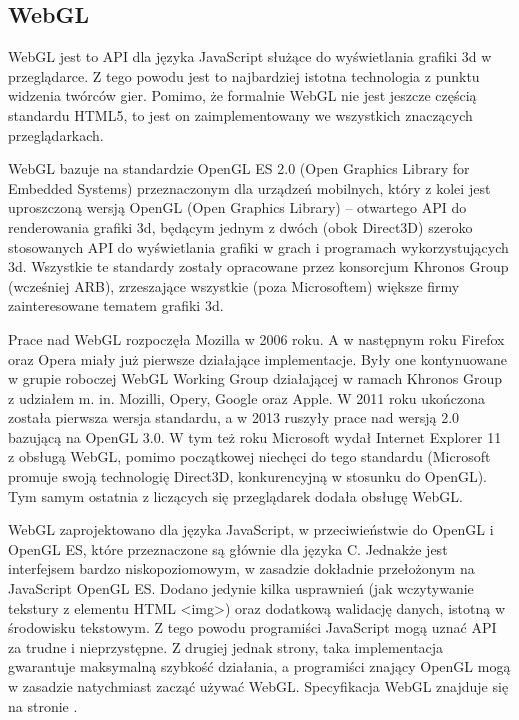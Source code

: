 \subsection{WebGL}
\label{ssec:webgl}

WebGL jest to API dla języka JavaScript służące do wyświetlania grafiki 3d w przeglądarce.
Z tego powodu jest to najbardziej istotna technologia z punktu widzenia
twórców gier. Pomimo, że formalnie WebGL nie jest jeszcze
częścią standardu HTML5, to jest on zaimplementowany we wszystkich znaczących
przeglądarkach.

WebGL bazuje na standardzie OpenGL ES 2.0 (Open Graphics Library for
Embedded Systems) przeznaczonym dla urządzeń mobilnych, który z kolei
jest uproszczoną wersją OpenGL (Open Graphics Library) -- otwartego API do
renderowania grafiki 3d, będącym jednym z dwóch (obok Direct3D) szeroko
stosowanych API do wyświetlania grafiki w grach i programach wykorzystujących 3d.
Wszystkie te standardy zostały opracowane przez konsorcjum Khronos Group (wcześniej ARB),
zrzeszające wszystkie (poza Microsoftem) większe firmy zainteresowane tematem grafiki 3d.

Prace nad WebGL rozpoczęła Mozilla w 2006 roku. A w następnym roku Firefox oraz Opera
miały już pierwsze działające implementacje. Były one kontynuowane w grupie roboczej
WebGL Working Group działającej w ramach Khronos Group z udziałem m. in. Mozilli,
Opery, Google oraz Apple. W 2011 roku ukończona została pierwsza wersja standardu, a w 2013
ruszyły prace nad wersją 2.0 bazującą na OpenGL 3.0. W tym też roku Microsoft wydał
Internet Explorer 11 z obsługą WebGL, pomimo początkowej niechęci do tego standardu
(Microsoft promuje swoją technologię Direct3D, konkurencyjną w stosunku do OpenGL).
Tym samym ostatnia z liczących się przeglądarek dodała obsługę WebGL.

WebGL zaprojektowano dla języka JavaScript, w przeciwieństwie do OpenGL i OpenGL ES,
które przeznaczone są głównie dla języka C. Jednakże jest interfejsem bardzo
niskopoziomowym, w zasadzie dokładnie przełożonym na JavaScript OpenGL ES. Dodano
jedynie kilka usprawnień (jak wczytywanie tekstury z elementu HTML <img>) oraz
dodatkową walidację danych, istotną w środowisku tekstowym. Z tego powodu programiści
JavaScript mogą uznać API za trudne i nieprzystępne. Z drugiej jednak strony, taka
implementacja gwarantuje maksymalną szybkość działania, a programiści znający OpenGL mogą
w zasadzie natychmiast zacząć używać WebGL. Specyfikacja WebGL znajduje się na stronie
\cite{webgl}.


